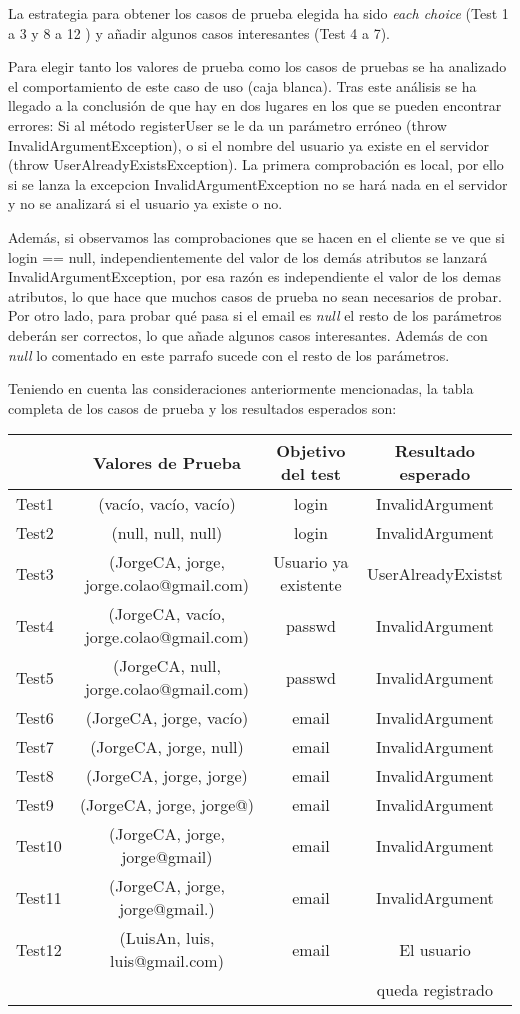 La estrategia para obtener los casos de prueba elegida ha sido
\textit{each choice} (Test 1 a 3 y 8 a 12 ) y añadir algunos casos
interesantes (Test 4 a 7).

Para elegir tanto los valores de prueba como los casos de pruebas se ha analizado el comportamiento de este caso de uso (caja blanca). Tras este análisis se ha llegado a la conclusión de que hay en dos lugares en los que se pueden encontrar errores: Si al método registerUser se le da un parámetro erróneo (throw InvalidArgumentException), o si el nombre del usuario ya existe en el servidor (throw UserAlreadyExistsException). La primera comprobación es local, por ello si se lanza la excepcion InvalidArgumentException no se hará nada en el servidor y no se analizará si el usuario ya existe o no.

Además, si observamos las comprobaciones que se hacen en el cliente se ve que si login == null, independientemente del valor de los demás atributos se lanzará  InvalidArgumentException, por esa razón es independiente el valor de los demas atributos, lo que hace que muchos casos de prueba no sean necesarios de probar. Por otro lado, para probar qué pasa si el email es \textit{null} el resto de los parámetros deberán ser correctos, lo que añade algunos casos interesantes. Además de con \textit{null} lo comentado en este parrafo sucede con el resto de los parámetros.


Teniendo en cuenta las consideraciones anteriormente mencionadas, la tabla completa de los casos de prueba y los resultados esperados son:

\newpage
{\footnotesize
\begin{longtable}[c]{l|c|c|c|}
 & \textbf{Valores de Prueba} & \textbf{Objetivo del test} & \textbf{Resultado esperado} \\
\hline \hline
\endhead

Test1 & (vacío, vacío, vacío)  & login & InvalidArgument\\
Test2 & (null, null, null) & login & InvalidArgument\\
Test3 & (JorgeCA, jorge, jorge.colao@gmail.com) & Usuario ya existente & UserAlreadyExistst\\
Test4 & (JorgeCA, vacío, jorge.colao@gmail.com) & passwd   & InvalidArgument\\
Test5 & (JorgeCA, null, jorge.colao@gmail.com) & passwd   & InvalidArgument\\
Test6 & (JorgeCA, jorge, vacío) & email   & InvalidArgument\\
Test7 & (JorgeCA, jorge, null) & email   & InvalidArgument\\
Test8 & (JorgeCA, jorge, jorge) & email & InvalidArgument\\
Test9 & (JorgeCA, jorge, jorge@) & email & InvalidArgument\\
Test10 & (JorgeCA, jorge, jorge@gmail) & email & InvalidArgument\\
Test11& (JorgeCA, jorge, jorge@gmail.) & email  & InvalidArgument\\
Test12& (LuisAn, luis, luis@gmail.com) & email  &  El usuario \\
& &  & queda registrado\\
\hline
\end{longtable}
}

